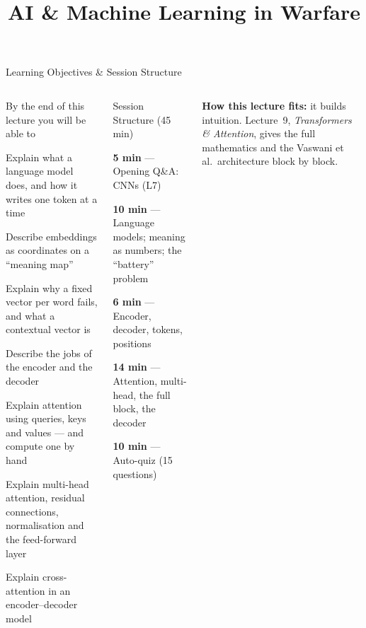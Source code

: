 \documentclass[aspectratio=169,10pt]{beamer}
\title{AI \& Machine Learning in Warfare}
\begin{document}


\begin{frame}{Learning Objectives \& Session Structure}
\begin{columns}[T]
\begin{cbox}{By the end of this lecture you will be able to}
\begin{te}
\item Explain what a language model does, and how it writes one token at a time
\item Describe embeddings as coordinates on a ``meaning map''
\item Explain why a fixed vector per word fails, and what a contextual vector is
\item Describe the jobs of the encoder and the decoder
\item Explain attention using queries, keys and values --- and compute one by hand
\item Explain multi-head attention, residual connections, normalisation and the feed-forward layer
\item Explain cross-attention in an encoder--decoder model
\end{te}
\end{cbox}
\begin{cbox}[ISSAnavy]{Session Structure (45 min)}
\begin{tl}
\item \textbf{5 min} --- Opening Q\&A: CNNs (L7)
\item \textbf{10 min} --- Language models; meaning as numbers; the ``battery'' problem
\item \textbf{6 min} --- Encoder, decoder, tokens, positions
\item \textbf{14 min} --- Attention, multi-head, the full block, the decoder
\item \textbf{10 min} --- Auto-quiz (15 questions)
\end{tl}
\end{cbox}
\begin{ibox}\textbf{How this lecture fits:} it builds intuition. Lecture~9, \emph{Transformers \& Attention}, gives the full mathematics and the Vaswani et al.\ architecture block by block.\end{ibox}
\end{columns}
\end{frame}
\end{document}
